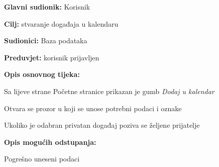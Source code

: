					\noindent {}
					\begin{packed_item}
						
						\item \textbf{Glavni sudionik: }Korisnik
						\item  \textbf{Cilj:} stvaranje događaja u kalendaru
						\item  \textbf{Sudionici:}
						Baza podataka
						\item  \textbf{Preduvjet:} korisnik prijavljen
						\item  \textbf{Opis osnovnog tijeka:}
						
						\item[] \begin{packed_enum}
							
							\item	Sa lijeve strane Početne stranice prikazan je gumb \textit{Dodaj u kalendar}
							\item 	Otvara se prozor u koji se unose potrebni podaci i oznake
							\item[] \begin{packed_enum}
								\item Ukoliko je odabran privatan događaj poziva se željene prijatelje
							\end{packed_enum}
							
						\end{packed_enum}
						
						\item  \textbf{Opis mogućih odstupanja:}
						
						\item[] \begin{packed_item}
							
							\item[2.a] Pogrešno uneseni podaci
							
						\end{packed_item}
					\end{packed_item}
					
